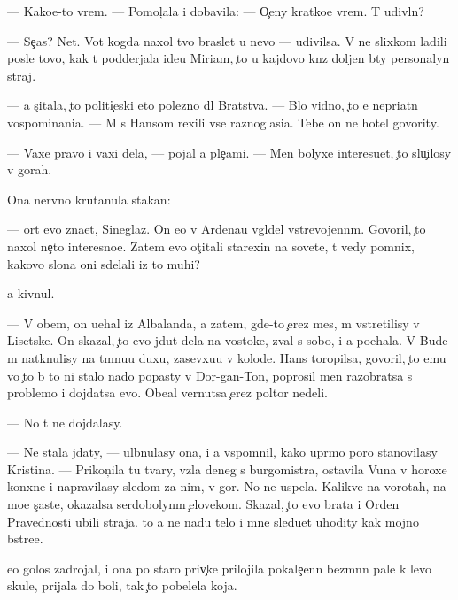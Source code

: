 \documentclass[10pt]{book}
\begin{document}
— Kako{\y}e-to vrem{\ia}. — Pomol{\c}ala i dobavila: — O{\c}eny kratko{\y}e vrem{\ia}. T{\yi} udivl{\e}n?

— Se{\y}{\c}as? Net. Vot kogda naxol tvo{\y} braslet u nevo — udivilsa. V{\yi} ne slixkom ladili posle tovo, kak t{\yi} podderjala ide{\y}u Miriam, {\c}to u kajdovo kn{\ia}z{\ia} doljen b{\yi}ty personalyn{\yi}{\y} straj.

— {\Y}a s{\c}itala, {\c}to politi{\c}eski eto polezno dl{\ia} Bratstva. — B{\yi}lo vidno, {\c}to {\y}e{\y} nepri{\y}atn{\yi} vospominani{\y}a. — M{\yi} s Hansom rexili vse raznoglasi{\y}a. Tebe on ne hotel govority.

— Vaxe pravo i vaxi dela, — pojal {\y}a ple{\c}ami. — Men{\ia} bolyxe interesu{\y}et, {\c}to slu{\c}ilosy v gorah.

Ona nervno krutanula stakan:

— {\C}ort {\y}evo zna{\y}et, Sineglaz{\yi}{\y}. On {\y}e{\x}o v Ardenau v{\yi}gl{\ia}del vstrevojenn{\yi}m. Govoril, {\c}to naxol ne{\c}to interesno{\y}e. Zatem {\y}evo ot{\c}itali stare{\y}xin{\yi} na sovete, t{\yi} vedy pomnix, kakovo slona oni sdelali iz to{\y} muhi?

{\Y}a kivnul.

— V ob{\x}em, on u{\y}ehal iz Albalanda, a zatem, gde-to {\c}erez mes{\ia}{\q}, m{\yi} vstretilisy v Lisetske. On skazal, {\c}to {\y}evo jdut dela na vostoke, zval s sobo{\y}, i {\y}a po{\y}ehala. V Bude m{\yi} natknulisy na t{\e}mnu{\y}u duxu, zasevxu{\y}u v kolod{\q}e. Hans toropilsa, govoril, {\c}to {\y}emu vo {\c}to b{\yi} to ni stalo nado popasty v Dor{\c}-gan-To{\y}n, poprosil men{\ia} razobratsa s problemo{\y} i dojdatsa {\y}evo. Obe{\x}al vernutsa {\c}erez poltor{\yi} nedeli.

— No t{\yi} ne dojdalasy.

— Ne stala jdaty, — ul{\yi}bnulasy ona, i {\y}a vspomnil, kako{\y} upr{\ia}mo{\y} poro{\y} stanovilasy Kristina. — Prikon{\c}ila tu tvary, vz{\ia}la deneg s burgomistra, ostavila V{\y}una v horoxe{\y} kon{\iu}xne i napravilasy sledom za nim, v gor{\yi}. No ne uspela. Kalikve{\q} na vorotah, na mo{\y}e s{\c}ast{\y}e, okazalsa serdobolyn{\yi}m {\c}elovekom. Skazal, {\c}to {\y}evo brat{\y}a i Orden Pravednosti ubili straja. {\C}to {\y}a ne na{\y}du telo i mne sledu{\y}et uhodity kak mojno b{\yi}stre{\y}e.

{\Y}e{\y}o golos zadrojal, i ona po staro{\y} priv{\yi}{\c}ke prilojila pokale{\c}enn{\yi}{\y} bez{\yi}m{\ia}nn{\yi}{\y} pale{\q} k levo{\y} skule, prijala do boli, tak {\c}to pobelela koja.
\end{document}
